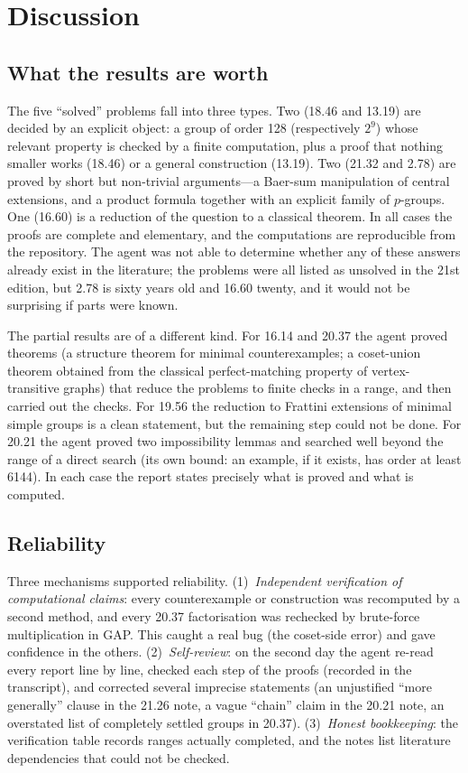 \section{Discussion}\label{sec:discussion}

\subsection{What the results are worth}
The five ``solved'' problems fall into three types. Two (18.46 and 13.19) are decided by an explicit object: a
group of order 128 (respectively $2^9$) whose relevant property is checked by a finite computation, plus a proof
that nothing smaller works (18.46) or a general construction (13.19). Two (21.32 and 2.78) are proved by short but
non-trivial arguments---a Baer-sum manipulation of central extensions, and a product formula together with an
explicit family of $p$-groups. One (16.60) is a reduction of the question to a classical theorem. In all cases the
proofs are complete and elementary, and the computations are reproducible from the repository. The agent was not
able to determine whether any of these answers already exist in the literature; the problems were all listed as
unsolved in the 21st edition, but 2.78 is sixty years old and 16.60 twenty, and it would not be surprising if
parts were known.

The partial results are of a different kind. For 16.14 and 20.37 the agent proved
theorems (a structure theorem for minimal counterexamples; a coset-union theorem obtained from the classical
perfect-matching property of vertex-transitive graphs) that reduce the problems to
finite checks in a range, and then carried out the checks. For 19.56 the reduction to Frattini extensions of
minimal simple groups is a clean statement, but the remaining step could not be done. For 20.21 the agent proved
two impossibility lemmas and searched well beyond the range of a direct search (its own bound: an example, if it exists, has order
at least 6144). In each case the report states precisely what is proved and what is
computed.

\subsection{Reliability}
Three mechanisms supported reliability. (1)~\emph{Independent verification of computational claims}: every
counterexample or construction was recomputed by a second method, and every 20.37 factorisation was rechecked by
brute-force multiplication in GAP. This caught a real bug (the coset-side error) and gave confidence in the others.
(2)~\emph{Self-review}: on the second day the agent re-read every report line by line, checked each step of the
proofs (recorded in the transcript), and corrected several imprecise statements (an unjustified ``more
generally'' clause in the 21.26 note, a vague ``chain'' claim in the 20.21 note, an overstated list of completely
settled groups in 20.37). (3)~\emph{Honest bookkeeping}: the verification table records ranges actually completed,
and the notes list literature dependencies that could not be checked.

